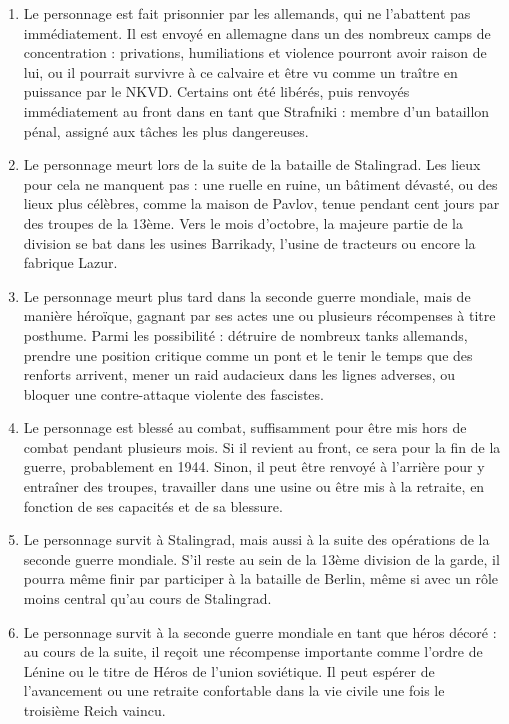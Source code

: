 \documentclass{report}
\begin{document}
\begin{multicols}{2}
\begin{enumerate}
   \item Le personnage est fait prisonnier par les allemands, qui ne l'abattent pas immédiatement. Il est envoyé en allemagne dans un des nombreux camps de concentration : privations, humiliations et violence pourront avoir raison de lui, ou il pourrait survivre à ce calvaire et être vu comme un traître en puissance par le NKVD. Certains ont été libérés, puis renvoyés immédiatement au front dans en tant que Strafniki : membre d'un bataillon pénal, assigné aux tâches les plus dangereuses.
    \item Le personnage meurt lors de la suite de la bataille de Stalingrad. Les lieux pour cela ne manquent pas : une ruelle en ruine, un bâtiment dévasté, ou des lieux plus célèbres, comme la maison de Pavlov, tenue pendant cent jours par des troupes de la 13ème. Vers le mois d'octobre, la majeure partie de la division se bat dans les usines Barrikady, l'usine de tracteurs ou encore la fabrique Lazur. 
    \item Le personnage meurt plus tard dans la seconde guerre mondiale, mais de manière héroïque, gagnant par ses actes une ou plusieurs récompenses à titre posthume. Parmi les possibilité : détruire de nombreux tanks allemands, prendre une position critique comme un pont et le tenir le temps que des renforts arrivent, mener un raid audacieux dans les lignes adverses, ou bloquer une contre-attaque violente des fascistes.
    \item Le personnage est blessé au combat, suffisamment pour être mis hors de combat pendant plusieurs mois. Si il revient au front, ce sera pour la fin de la guerre, probablement en 1944. Sinon, il peut être renvoyé à l'arrière pour y entraîner des troupes, travailler dans une usine ou être mis à la retraite, en fonction de ses capacités et de sa blessure.
    \item Le personnage survit à Stalingrad, mais aussi à la suite des opérations de la seconde guerre mondiale. S'il reste au sein de la 13ème division de la garde, il pourra même finir par participer à la bataille de Berlin, même si avec un rôle moins central qu'au cours de Stalingrad. 
    \item Le personnage survit à la seconde guerre mondiale en tant que héros décoré : au cours de la suite, il reçoit une récompense importante comme l'ordre de Lénine ou le titre de Héros de l'union soviétique. Il peut espérer de l'avancement ou une retraite confortable dans la vie civile une fois le troisième Reich vaincu.
\end{enumerate}


\end{multicols}
\end{document}
